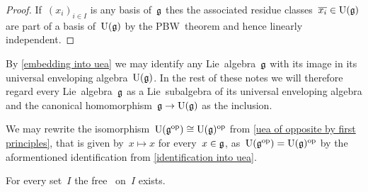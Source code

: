 \begin{proof}
  If~$(x_i)_{i \in I}$ is any basis of~$\mathfrak{g}$ thes the associated residue classes~$\overline{x_i} \in \operatorname{U}(\mathfrak{g})$ are part of a basis of~$\operatorname{U}(\mathfrak{g})$ by the PBW~theorem and hence linearly independent.
\end{proof}


\begin{remark}
  \label{identification into uea}
  By \cref{embedding into uea} we may identify any Lie~algebra~$\mathfrak{g}$ with its image in its universal enveloping algebra~$\operatorname{U}(\mathfrak{g})$.
  In the rest of these notes we will therefore regard every Lie~algebra~$\mathfrak{g}$ as a Lie~subalgebra of its universal enveloping algebra and the canonical homomorphism~$\mathfrak{g} \to \operatorname{U}(\mathfrak{g})$ as the inclusion.
\end{remark}


\begin{remark}
  We may rewrite the isomorphism~$\operatorname{U}(\mathfrak{g}^{\mathrm{op}}) \cong \operatorname{U}(\mathfrak{g})^{\mathrm{op}}$ from \cref{uea of opposite by first principles}, that is given by~$x \mapsto x$ for every~$x \in \mathfrak{g}$, as~$\operatorname{U}(\mathfrak{g}^{\mathrm{op}}) = \operatorname{U}(\mathfrak{g})^{\mathrm{op}}$ by the aformentioned identification from \cref{identification into uea}.
\end{remark}


\begin{corollary}
  For every set~$I$ the free~{\liealgebra{$\kf$}} on~$I$ exists.
\end{corollary}


